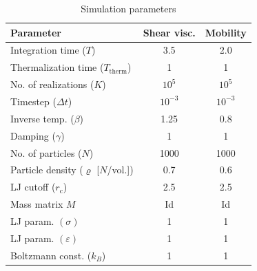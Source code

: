 %
\begin{table}[h!]
\begin{center}
	\begin{tabular}{lcc} 
	\toprule
	\bf{Parameter} & {\bf Shear visc.} & {\bf Mobility} \\
	\midrule
    Integration time ($T$) & 3.5 & 2.0 \\
    Thermalization time ($T_\mathrm{therm}$) & 1 & 1 \\
	No. of realizations ($K$) & $10^5$ & $10^5$ \\
	Timestep ($\Delta t$) & $10^{-3}$ & $10^{-3}$ \\
	Inverse temp. ($\beta$) & 1.25 & 0.8 \\
	Damping ($\gamma$) & 1 & 1 \\
	No. of particles ($N$) & 1000 & 1000 \\
	Particle density ($\varrho$ [$N$/vol.]) & 0.7 & 0.6 \\
	LJ cutoff ($r_\mathrm{c}$) & 2.5 & 2.5 \\
	Mass matrix $M$ & {\rm Id} & {\rm Id} \\
	LJ param. $(\sigma)$ & 1 & 1 \\
	LJ param. $(\varepsilon)$ & 1 & 1 \\
	Boltzmann const. ($k_B$) & 1 & 1 \\
	\bottomrule
	\end{tabular}
\end{center}
\caption{Simulation parameters}
\label{table:sim_params}
\end{table}

